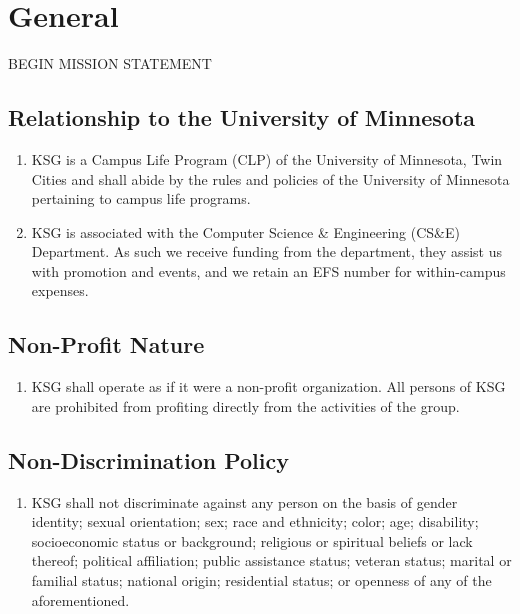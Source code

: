 \documentclass[12pt,letterpaper]{article}
\begin{document}
\section{General}

BEGIN MISSION STATEMENT

\subsection{Relationship to the University of Minnesota}
\begin{enumerate}
  \item KSG is a Campus Life Program (CLP) of the University of Minnesota,
        Twin Cities and shall abide by the rules and policies of the University
        of Minnesota pertaining to campus life programs.
  \item KSG is associated with the Computer Science \& Engineering (CS\&E)
        Department. As such we receive funding from the department, they assist
        us with promotion and events, and we retain an EFS number for
        within-campus expenses.
\end{enumerate}

\subsection{Non-Profit Nature}
\begin{enumerate}
  \item KSG shall operate as if it were a non-profit organization. All persons
        of KSG are prohibited from profiting directly from the activities of
        the group.
\end{enumerate}

\subsection{Non-Discrimination Policy}
\begin{enumerate}
  \item KSG shall not discriminate against any person on the basis of gender
        identity; sexual orientation; sex; race and ethnicity; color; age;
        disability; socioeconomic status or background; religious or spiritual
        beliefs or lack thereof; political affiliation; public assistance status;
        veteran status; marital or familial status; national origin; residential
        status; or openness of any of the aforementioned.
\end{enumerate}
\end{document}
